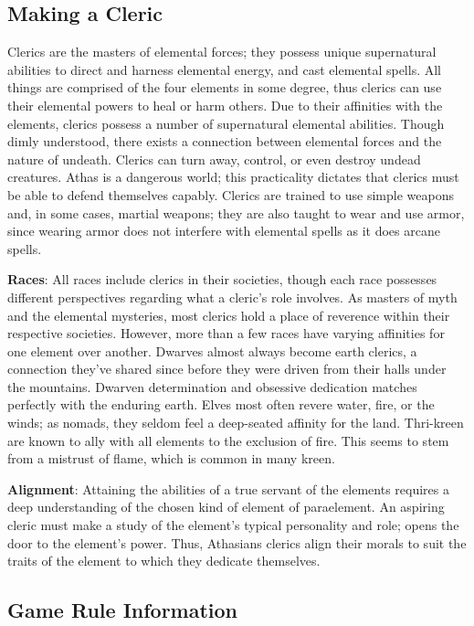 \subsection{Making a Cleric}
Clerics are the masters of elemental forces; they possess unique supernatural abilities to direct and harness elemental energy, and cast elemental spells. All things are comprised of the four elements in some degree, thus clerics can use their elemental powers to heal or harm others. Due to their affinities with the elements, clerics possess a number of supernatural elemental abilities. Though dimly understood, there exists a connection between elemental forces and the nature of undeath. Clerics can turn away, control, or even destroy undead creatures. Athas is a dangerous world; this practicality dictates that clerics must be able to defend themselves capably. Clerics are trained to use simple weapons and, in some cases, martial weapons; they are also taught to wear and use armor, since wearing armor does not interfere with elemental spells as it does arcane spells.

\textbf{Races}: All races include clerics in their societies, though each race possesses different perspectives regarding what a cleric's role involves. As masters of myth and the elemental mysteries, most clerics hold a place of reverence within their respective societies. However, more than a few races have varying affinities for one element over another. Dwarves almost always become earth clerics, a connection they've shared since before they were driven from their halls under the mountains. Dwarven determination and obsessive dedication matches perfectly with the enduring earth. Elves most often revere water, fire, or the winds; as nomads, they seldom feel a deep-seated affinity for the land. Thri-kreen are known to ally with all elements to the exclusion of fire. This seems to stem from a mistrust of flame, which is common in many kreen.

\textbf{Alignment}: Attaining the abilities of a true servant of the elements requires a deep understanding of the chosen kind of element of paraelement. An aspiring cleric must make a study of the element's typical personality and role; opens the door to the element's power. Thus, Athasians clerics align their morals to suit the traits of the element to which they dedicate themselves.

\subsection{Game Rule Information}

